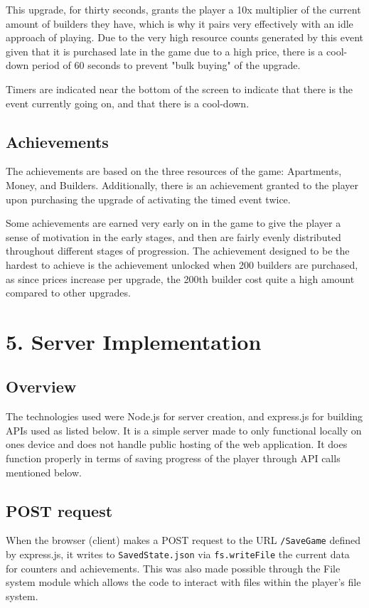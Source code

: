 \documentclass{article}
\begin{document}
This upgrade, for thirty seconds, grants the player a 10x multiplier of the current amount of builders they have, which is why it pairs very effectively with an idle approach of playing. Due to the very high resource counts generated by this event given that it is purchased late in the game due to a high price, there is a cool-down period of 60 seconds to prevent "bulk buying" of the upgrade. 

Timers are indicated near the bottom of the screen to indicate that there is the event currently going on, and that there is a cool-down. 
\subsection*{Achievements}
The achievements are based on the three resources of the game: Apartments, Money, and Builders. Additionally, there is an achievement granted to the player upon purchasing the upgrade of activating the timed event twice. 

Some achievements are earned very early on in the game to give the player a sense of motivation in the early stages, and then are fairly evenly distributed throughout different stages of progression. The achievement designed to be the hardest to achieve is the achievement unlocked when 200 builders are purchased, as since prices increase per upgrade, the 200th builder cost quite a high amount compared to other upgrades. 
\section*{5. Server Implementation}
\subsection*{Overview}
The technologies used were Node.js for server creation, and express.js for building APIs used as listed below. It is a simple server made to only functional locally on ones device and does not handle public hosting of the web application. It does function properly in terms of saving progress of the player through API calls mentioned below.  

\subsection*{POST request}
When the browser (client) makes a POST request to the URL \texttt{/SaveGame} defined by express.js, it writes to \texttt{SavedState.json} via \texttt{fs.writeFile} the current data for counters and achievements. This was also made possible through the File system module which allows the code to interact with files within the player's file system. 
\end{document}

